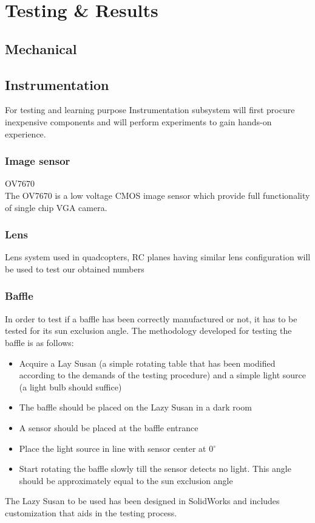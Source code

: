 \documentclass[../../main.tex]{subfiles}
\begin{document}
\chapter{Testing \& Results}
\thispagestyle{fancy}


\section{Mechanical}
\blindtext

\section{Instrumentation}
For testing and learning purpose Instrumentation subsystem will first procure inexpensive components and will perform experiments to gain hands-on experience.
\subsection{Image sensor}
    OV7670
    \\The OV7670 is a low voltage CMOS image sensor which provide full functionality of single chip VGA camera.
\subsection{Lens}
    Lens system used in quadcopters, RC planes having similar lens configuration will be used to test our obtained numbers
\subsection{Baffle}
    In order to test if a baffle has been correctly manufactured or not, it has to be tested for its sun exclusion angle. The methodology developed for testing the baffle is as follows:
\begin{itemize}
    \item Acquire a Lay Susan (a simple rotating table that has been modified according to the demands of the testing procedure) and a simple light source (a light bulb should suffice)
    \item The baffle should be placed on the Lazy Susan in a dark room
    \item A sensor should be placed at the baffle entrance
    \item Place the light source in line with sensor center at 0$^\circ$
    \item Start rotating the baffle slowly till the sensor detects no light. This angle should be approximately equal to the sun exclusion angle
\end{itemize}
\par
The Lazy Susan to be used has been designed in SolidWorks and includes customization that aids in the testing process.
\end{document}
